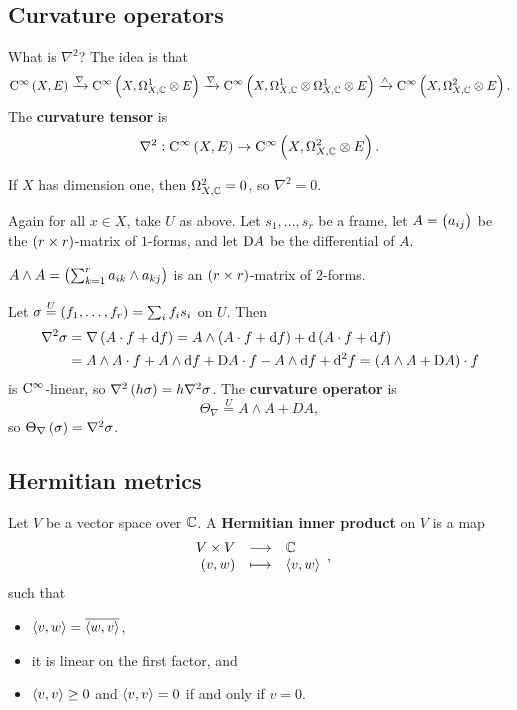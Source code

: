 \subsection{Curvature operators}

What is $ \nabla^2 $? The idea is that
$$ \C^\infty\br{X, E} \xrightarrow{\nabla} \C^\infty\br{X, \Omega_{X, \CC}^1 \otimes E} \xrightarrow{\nabla} \C^\infty\br{X, \Omega_{X, \CC}^1 \otimes \Omega_{X, \CC}^1 \otimes E} \xrightarrow{\wedge} \C^\infty\br{X, \Omega_{X, \CC}^2 \otimes E}. $$
The \textbf{curvature tensor} is
$$ \nabla^2 : \C^\infty\br{X, E} \to \C^\infty\br{X, \Omega_{X, \CC}^2 \otimes E}. $$

\begin{remark*}
If $ X $ has dimension one, then $ \Omega_{X, \mathbb{C}}^2 = 0 $, so $ \nabla^2 = 0 $.
\end{remark*}

Again for all $ x \in X $, take $ U $ as above. Let $ s_1, \dots, s_r $ be a frame, let $ A = \br{a_{ij}} $ be the $ \br{r \times r} $-matrix of $ 1 $-forms, and let $ \mathrm{D} A $ be the differential of $ A $.

\begin{notation*}
$ A \wedge A = \br{\sum_{k = 1}^r a_{ik} \wedge a_{kj}} $ is an $ \br{r \times r} $-matrix of $ 2 $-forms.
\end{notation*}

Let $ \sigma \overset{U}{=} \br{f_1, \dots, f_r} = \sum_i f_is_i $ on $ U $. Then
\begin{align*}
\nabla^2\sigma
& = \nabla\br{A \cdot f + \d f}
= A \wedge \br{A \cdot f + \d f} + \d\br{A \cdot f + \d f} \\
& = A \wedge A \cdot f + A \wedge \d f + \D A \cdot f - A \wedge \d f + \d^2f
= \br{A \wedge A + \D A} \cdot f
\end{align*}
is $ \mathrm{C}^\infty $-linear, so $ \nabla^2\br{h\sigma} = h\nabla^2\sigma $. The \textbf{curvature operator} is
$$ \Theta_\nabla \overset{U}{=} A \wedge A + DA, $$
so $ \Theta_\nabla\br{\sigma} = \nabla^2\sigma $.

\subsection{Hermitian metrics}

\begin{definition}
Let $ V $ be a vector space over $ \mathbb{C} $. A \textbf{Hermitian inner product} on $ V $ is a map
$$ \function{V \times V}{\CC}{\br{v, w}}{\abr{v, w}}, $$
such that
\begin{itemize}
\item $ \left\langle v, w \right\rangle = \overline{\left\langle w, v \right\rangle} $,
\item it is linear on the first factor, and
\item $ \left\langle v, v \right\rangle \ge 0 $ and $ \left\langle v, v \right\rangle = 0 $ if and only if $ v = 0 $.
\end{itemize}
\end{definition}

